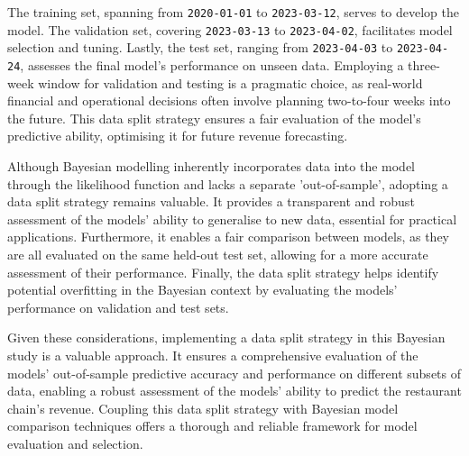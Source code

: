 The training set, spanning from \texttt{2020-01-01} to \texttt{2023-03-12},
serves to develop the model. The validation set, covering \texttt{2023-03-13}
to \texttt{2023-04-02}, facilitates model selection and tuning. Lastly, the
test set, ranging from \texttt{2023-04-03} to \texttt{2023-04-24}, assesses the
final model's performance on unseen data. Employing a three-week window for
validation and testing is a pragmatic choice, as real-world financial and
operational decisions often involve planning two-to-four weeks into the future.
This data split strategy ensures a fair evaluation of the model's predictive
ability, optimising it for future revenue forecasting.

Although Bayesian modelling inherently incorporates data into the model through
the likelihood function and lacks a separate 'out-of-sample', adopting a data
split strategy remains valuable. It provides a transparent and robust
assessment of the models' ability to generalise to new data, essential for
practical applications. Furthermore, it enables a fair comparison between
models, as they are all evaluated on the same held-out test set, allowing for a
more accurate assessment of their performance. Finally, the data split strategy
helps identify potential overfitting in the Bayesian context by evaluating the
models' performance on validation and test sets.

Given these considerations, implementing a data split strategy in this Bayesian
study is a valuable approach. It ensures a comprehensive evaluation of the
models' out-of-sample predictive accuracy and performance on different subsets
of data, enabling a robust assessment of the models' ability to predict the
restaurant chain's revenue. Coupling this data split strategy with Bayesian
model comparison techniques offers a thorough and reliable framework for model
evaluation and selection.
